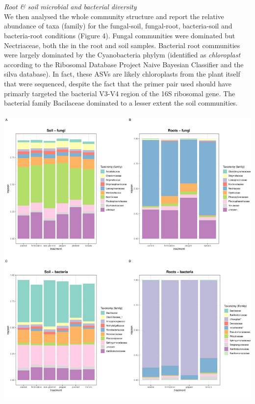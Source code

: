 \documentclass[11pt,]{article}
\begin{document}
~\\
\hspace*{0.333em}\\
\emph{Root \& soil microbial and bacterial diversity}\\
We then analysed the whole community structure and report the relative
abundance of taxa (family) for the fungal-soil, fungal-root,
bacteria-soil and bacteria-root conditions (Figure 4). Fungal
communities were dominated but Nectriaceae, both the in the root and
soil samples. Bacterial root communities were largely dominated by the
Cyanobacteria phylym (identified as \emph{chloroplast} according to the
Ribosomal Database Project Naive Bayesian Classifier and the silva
database). In fact, these ASVs are likely chloroplasts from the plant
itself that were sequenced, despite the fact that the primer pair used
should have primarly targeted the bacterial V3-V4 region of the 16S
ribosomal gene. The bacterial family Bacilaceae dominated to a lesser
extent the soil communities.\\
\hspace*{0.333em}\\
\includegraphics[width=7.29167in]{../figures/Figure4_barplots.pdf}\\
\end{document}
